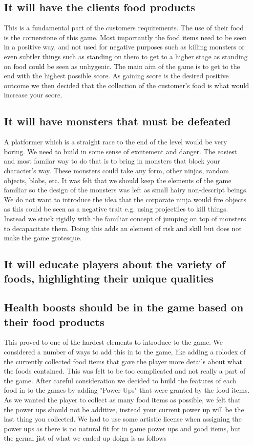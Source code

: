 \documentclass{article}
\begin{document}
\subsection{ It will have the clients food products }
This is a fundamental part of the customers requirements. The use of their food is the cornerstone of this game.
Most importantly the food items need to be seen in a positive way, and not used for negative purposes such as killing monsters or even subtler things such as standing on them to get to a higher stage as standing on food could be seen as unhygenic. 
The main aim of the game is to get to the end with the highest possible score. As gaining score is the desired positive outcome we then decided that the collection of the customer's food is what would increase your score.

\subsection{ It will have monsters that must be defeated }
A platformer which is a straight race to the end of the level would be very boring. We need to build in some sense of excitement and danger. The easiest and most familar way to do that is to bring in monsters that block your character's way. These monsters could take any form, other ninjas, random objects, blobs, etc. It was felt that we should keep the elements of the game familiar so the design of the monsters was left as small hairy non-descript beings. 
We do not want to introduce the idea that the corporate ninja would fire objects as this could be seen as a negative trait e.g. using projectiles to kill things. Instead we stuck rigidly with the familiar concept of jumping on top of monsters to decapacitate them. Doing this adds an element of risk and skill but does not make the game grotesque.

\subsection{ It will educate players about the variety of foods, highlighting their unique qualities }
\subsection{ Health boosts should be in the game based on their food products }
This proved to one of the hardest elements to introduce to the game. We considered a number of ways to add this in to the game, like adding a rolodex of the currently collected food items that gave the player more details about what the foods contained. This was felt to be too complicated and not really a part of the game. After careful consideration we decided to build the features of each food in to the games by adding "Power Ups" that were granted by the food items.
As we wanted the player to collect as many food items as possible, we felt that the power ups should not be additive, instead your current power up will be the last thing you collected.
We had to use some artistic license when assigning the power ups as there is no natural fit for in game power ups and good items, but the gernal jist of what we ended up doign is as follows
\end{document}
